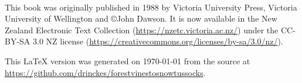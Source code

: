 \thispagestyle{empty}

~\vfill

This book was originally published in 1988 by Victoria University Press, Victoria University of Wellington and ©John Dawson.
It is now available in the New Zealand Electronic Text Collection (\url{https://nzetc.victoria.ac.nz/}) under the CC-BY-SA 3.0 NZ license (\url{https://creativecommons.org/licenses/by-sa/3.0/nz/}).

This \LaTeX{} version was generated on \today{} from the source at \url{https://github.com/drinckes/forestvinestosnowtussocks}.

\vspace{3mm}
\begin{center}
	\ISBNgraphic{}
\end{center}
